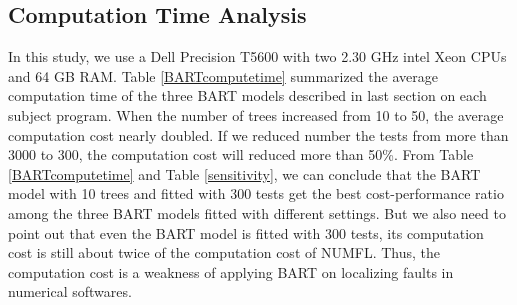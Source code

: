 \subsection{Computation Time Analysis}
In this study, we use a Dell Precision T5600 with two 2.30 GHz intel Xeon CPUs and 64 GB RAM. Table \ref{BARTcomputetime} summarized the average computation time of the three BART models described in last section on each subject program.  When the number of trees increased from 10 to 50, the average computation cost nearly doubled. If we reduced number the tests from more than 3000 to 300, the computation cost will reduced more than 50\%.  From Table \ref{BARTcomputetime} and Table \ref{sensitivity}, we can conclude that the BART model with 10 trees and fitted with 300 tests get the best cost-performance ratio among the three BART models fitted with different settings. But we also need to point out that even the BART model is fitted with 300 tests, its computation cost is still about twice of the computation cost of NUMFL. Thus, the computation cost is a weakness of applying BART on localizing faults in numerical softwares. 

